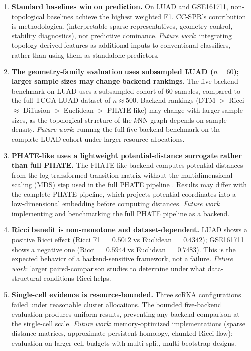 \documentclass[11pt]{article}
\begin{document}
\begin{enumerate}[leftmargin=1.5em]
\item \textbf{Standard baselines win on prediction.}
On LUAD and GSE161711, non-topological baselines achieve the highest weighted F1.
CC-SPR's contribution is methodological (interpretable sparse representatives, geometry control, stability diagnostics), not predictive dominance.
\emph{Future work}: integrating topology-derived features as additional inputs to conventional classifiers, rather than using them as standalone predictors.

\item \textbf{The geometry-family evaluation uses subsampled LUAD ($n = 60$); larger sample sizes may change backend rankings.}
The five-backend benchmark on LUAD uses a subsampled cohort of 60 samples, compared to the full TCGA-LUAD dataset of $n \approx 500$.
Backend rankings (DTM $>$ Ricci $\approx$ Diffusion $>$ Euclidean $>$ PHATE-like) may change with larger sample sizes, as the topological structure of the $k$NN graph depends on sample density.
\emph{Future work}: running the full five-backend benchmark on the complete LUAD cohort under larger resource allocations.

\item \textbf{PHATE-like uses a lightweight potential-distance surrogate rather than full PHATE.}
The PHATE-like backend computes potential distances from the log-transformed transition matrix without the multidimensional scaling (MDS) step used in the full PHATE pipeline \cite{moon2019phate}.
Results may differ with the complete PHATE pipeline, which projects potential coordinates into a low-dimensional embedding before computing distances.
\emph{Future work}: implementing and benchmarking the full PHATE pipeline as a backend.

\item \textbf{Ricci benefit is non-monotone and dataset-dependent.}
LUAD shows a positive Ricci effect (Ricci F1 $= 0.5012$ vs Euclidean $= 0.4342$); GSE161711 shows a negative one (Ricci $= 0.5944$ vs Euclidean $= 0.7483$).
This is the expected behavior of a backend-sensitive framework, not a failure.
\emph{Future work}: larger paired-comparison studies to determine under what data-structural conditions Ricci helps.

\item \textbf{Single-cell evidence is resource-bounded.}
Three scRNA configurations failed under reasonable cluster allocations.
The bounded five-backend evaluation produces uniform results, preventing any backend comparison at the single-cell scale.
\emph{Future work}: memory-optimized implementations (sparse distance matrices, approximate persistent homology, chunked Ricci flow); evaluation on larger cell budgets with multi-split, multi-bootstrap designs.


\end{enumerate}
\end{document}
